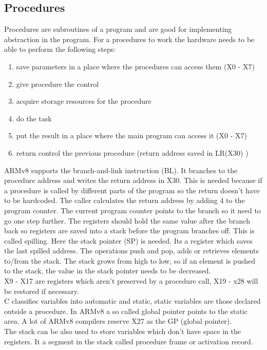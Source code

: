 \documentclass[a4paper]{scrartcl}
\begin{document}
            \subsection{Procedures}
                Procedures are subroutines of a program and are good for implementing abstraction in the program. For a procedures to work the hardware needs to be able to perform the following steps:
                \begin{enumerate}
                    \item save parameters in a place where the procedures can access them (X0 - X7)
                    \item give procedure the control
                    \item acquire storage resources for the procedure
                    \item do the task
                    \item put the result in a place where the main program can access it (X0 - X7)
                    \item return control the previous procedure (return address saved in LR(X30) ) 
                \end{enumerate}
                ARMv8 supports the branch-and-link instruction (BL). It branches to the procedure address and writes the return address in X30. This is needed because if a procedure
                is called by different parts of the program so the return doesn't have to be hardcoded.%
                The caller calculates the return address by adding 4 to the program counter. The current program counter points to the branch so it need to go one step further.
                The registers should hold the same value after the branch back so registers are saved into a stack before the program branches off. This is called spilling. 
                Here the stack pointer (SP) is needed.
                Its a register which saves the last spilled address. The operations push and pop, adds or retrieves elements to/from the stack. The stack grows from high to low, so if an
                element is pushed to the stack, the value in the stack pointer needs to be decreased. \\
                X9 - X17 are registers which aren't preserved by a procedure call, X19 - x28 will be restored if necessary.\\
                C classifies variables into automatic and static, static variables are those declared outside a procedure. In ARMv8 
                a so called global pointer points to the static area. A lot of ARMv8 compilers reserve X27 as the GP (global pointer).\\
                The stack can be also used to store variables which don't have space in the registers. It a segment in the stack called procedure frame or activation record.  
\end{document}
